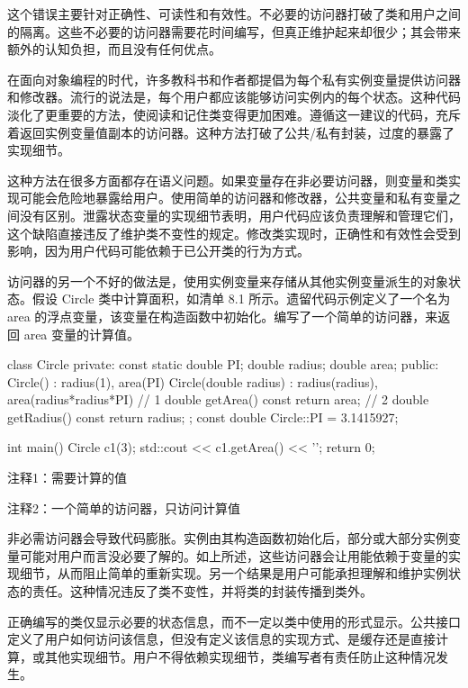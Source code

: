这个错误主要针对正确性、可读性和有效性。不必要的访问器打破了类和用户之间的隔离。这些不必要的访问器需要花时间编写，但真正维护起来却很少；其会带来额外的认知负担，而且没有任何优点。

在面向对象编程的时代，许多教科书和作者都提倡为每个私有实例变量提供访问器和修改器。流行的说法是，每个用户都应该能够访问实例内的每个状态。这种代码淡化了更重要的方法，使阅读和记住类变得更加困难。遵循这一建议的代码，充斥着返回实例变量值副本的访问器。这种方法打破了公共/私有封装，过度的暴露了实现细节。


这种方法在很多方面都存在语义问题。如果变量存在非必要访问器，则变量和类实现可能会危险地暴露给用户。使用简单的访问器和修改器，公共变量和私有变量之间没有区别。泄露状态变量的实现细节表明，用户代码应该负责理解和管理它们，这个缺陷直接违反了维护类不变性的规定。修改类实现时，正确性和有效性会受到影响，因为用户代码可能依赖于已公开类的行为方式。

访问器的另一个不好的做法是，使用实例变量来存储从其他实例变量派生的对象状态。假设 Circle 类中计算面积，如清单 8.1 所示。遗留代码示例定义了一个名为 area 的浮点变量，该变量在构造函数中初始化。编写了一个简单的访问器，来返回 area 变量的计算值。


\begin{cpp}
class Circle {
private:
  const static double PI;
  double radius;
  double area;
public:
  Circle() : radius(1), area(PI) {}
  Circle(double radius) : radius(radius),
    area(radius*radius*PI) {} // 1
  double getArea() const { return area; } // 2
  double getRadius() const { return radius; }
};
const double Circle::PI = 3.1415927;

int main() {
  Circle c1(3);
  std::cout << c1.getArea() << '\n';
  return 0;
}
\end{cpp}

{\footnotesize
注释1：需要计算的值

注释2：一个简单的访问器，只访问计算值
}

非必需访问器会导致代码膨胀。实例由其构造函数初始化后，部分或大部分实例变量可能对用户而言没必要了解的。如上所述，这些访问器会让用能依赖于变量的实现细节，从而阻止简单的重新实现。另一个结果是用户可能承担理解和维护实例状态的责任。这种情况违反了类不变性，并将类的封装传播到类外。


正确编写的类仅显示必要的状态信息，而不一定以类中使用的形式显示。公共接口定义了用户如何访问该信息，但没有定义该信息的实现方式、是缓存还是直接计算，或其他实现细节。用户不得依赖实现细节，类编写者有责任防止这种情况发生。

